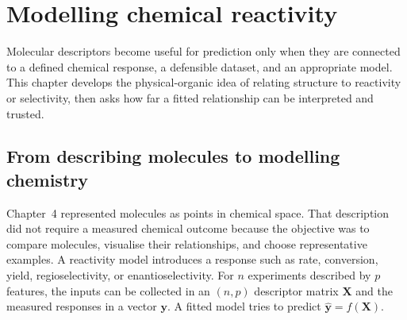 
\chapter{Modelling chemical reactivity}

\begin{notebox}
  Molecular descriptors become useful for prediction only when they are connected to a defined chemical response, a defensible dataset, and an appropriate model.
  This chapter develops the physical-organic idea of relating structure to reactivity or selectivity, then asks how far a fitted relationship can be interpreted and trusted.
\end{notebox}

\section{From describing molecules to modelling chemistry}

Chapter~4 represented molecules as points in chemical space.
That description did not require a measured chemical outcome because the objective was to compare molecules, visualise their relationships, and choose representative examples.
A reactivity model introduces a response such as rate, conversion, yield, regioselectivity, or enantioselectivity.
For $n$ experiments described by $p$ features, the inputs can be collected in an $(n, p)$ descriptor matrix $\mathbf{X}$ and the measured responses in a vector $\mathbf{y}$.
A fitted model tries to predict  $\hat{\mathbf{y}}=f(\mathbf{X})$.

